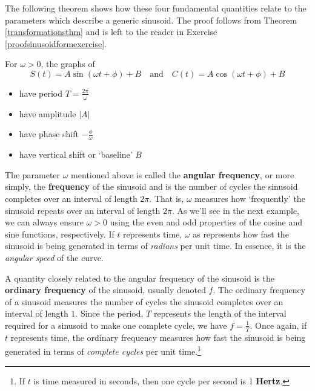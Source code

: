 \documentclass{ximera}
\begin{document}
The following theorem shows how these four fundamental quantities relate to the parameters which describe a generic sinusoid.   The proof follows from  Theorem \ref{transformationsthm} and is left to the reader in Exercise \ref{proofsinusoidformexercise}.




\begin{theorem}  \label{sinusoidform} For $\omega > 0$, the graphs of \[S(t) = A \sin(\omega t + \phi) + B \quad \text{and} \quad C(t) = A \cos(\omega t + \phi) + B  \]

\begin{itemize}

\item  have period  $T = \frac{2\pi}{\omega}$

\item  have amplitude $|A|$

\item  have phase shift $-\frac{\phi}{\omega}$

\item  have vertical shift or `baseline'  $B$

\end{itemize}


\end{theorem}





The parameter $\omega$ mentioned above is called the \textbf{angular frequency}, or more simply, the  \textbf{frequency}  of the sinusoid and is the number of cycles the sinusoid completes over an interval of length $2\pi$.  That is, $\omega$ measures how `frequently' the sinusoid repeats over an interval of length $2\pi$.  As we'll see in the next example, we can always ensure $\omega > 0$ using the even and odd properties of the cosine and sine functions, respectively.  If $t$ represents time,  $\omega$ as represents  how fast the sinusoid is being generated in terms of \textit{radians} per unit time.  In essence, it is the \textit{angular speed} of the curve.



A quantity closely related to the angular frequency of the sinusoid is  the \textbf{ordinary frequency} of the sinusoid, usually denoted $f$.  The ordinary frequency of a sinusoid measures the number of cycles the sinusoid completes over an interval of length $1$.  Since the period, $T$ represents the length of the interval  required for a sinusoid to make one complete cycle, we have $f =\frac{1}{T}$.   Once again, if $t$ represents time, the ordinary frequency measures how fast the sinusoid is being generated in terms of \textit{complete cycles} per unit time.\footnote{If $t$ is time measured in seconds, then one cycle per second is 1 \textbf{Hertz}.}  
\end{document}
